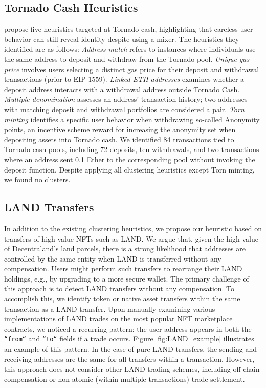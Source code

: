 \documentclass[12pt,a4paper,titlepage,oneside,english]{article}
\begin{document}
\subsection{Tornado Cash Heuristics}
\cite{wu2022tutela} propose five heuristics targeted at Tornado cash, highlighting that careless user behavior can still reveal identity despite using a mixer. The heuristics they identified are as follows: \newline
\textit{Address match} refers to instances where individuals use the same address to deposit and withdraw from the Tornado pool. \textit{Unique gas price} involves users selecting a distinct gas price for their deposit and withdrawal transactions (prior to EIP-1559). \textit{Linked ETH addresses} examines whether a deposit address interacts with a withdrawal address outside Tornado Cash. \textit{Multiple denomination} assesses an address' transaction history; two addresses with matching deposit and withdrawal portfolios are considered a pair. \textit{Torn minting} identifies a specific user behavior when withdrawing so-called Anonymity points, an incentive scheme reward for increasing the anonymity set when depositing assets into Tornado cash.\newline
We identified 84 transactions tied to Tornado cash pools, including 72 deposits, ten withdrawals, and two transactions where an address sent 0.1 Ether to the corresponding pool without invoking the deposit function.  Despite applying all clustering heuristics except Torn minting, we found no clusters.

\subsection{LAND Transfers}
In addition to the existing clustering heuristics, we propose our heuristic based on transfers of high-value NFTs such as LAND. We argue that, given the high value of Decentraland's land parcels, there is a strong likelihood that addresses are controlled by the same entity when LAND is transferred without any compensation. Users might perform such transfers to rearrange their LAND holdings, e.g., by upgrading to a more secure wallet. \newline
The primary challenge of this approach is to detect LAND transfers without any compensation. To accomplish this, we identify token or native asset transfers within the same transaction as a LAND transfer. Upon manually examining various implementations of LAND trades on the most popular NFT marketplace contracts, we noticed a recurring pattern: the user address appears in both the \texttt{``from``} and \texttt{``to``} fields if a trade occurs. Figure \ref{fig:LAND_example} illustrates an example of this pattern. 
In the case of pure LAND transfers, the sending and receiving addresses are the same for all transfers within a transaction. However, this approach does not consider other LAND trading schemes, including off-chain compensation or non-atomic (within multiple transactions) trade settlement.
\end{document}
